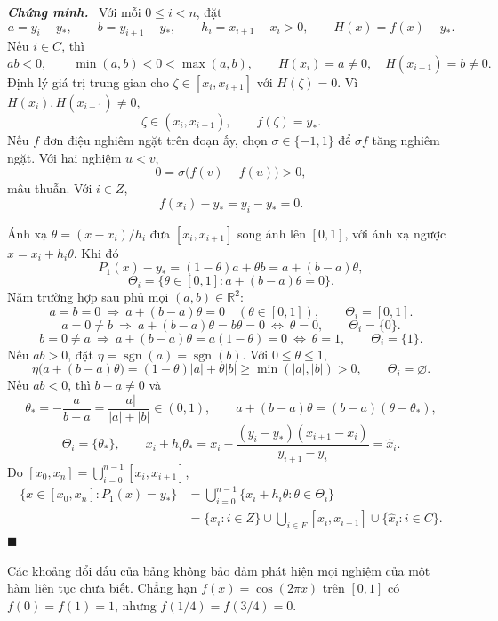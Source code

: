 \documentclass[12pt,a4paper,oneside]{book}
\numberwithin{algorithm}{chapter}
\theoremstyle{definition}
\newenvironment{chungminh}{\par\medskip\noindent\textbf{\textit{\color{mainblue}Chứng minh.}}\ }{\hfill$\blacksquare$\par\medskip}
\newcommand{\R}{\mathbb{R}}
\begin{document}
\begin{chungminh}
Với mỗi $0\leq i<n$, đặt
\[
 a=y_i-y_\ast,\qquad b=y_{i+1}-y_\ast,\qquad
 h_i=x_{i+1}-x_i>0,\qquad H(x)=f(x)-y_\ast.
\]
Nếu $i\in C$, thì
\[
 ab<0,\qquad\min(a,b)<0<\max(a,b),\qquad
 H(x_i)=a\ne0,\quad H(x_{i+1})=b\ne0.
\]
Định lý giá trị trung gian cho $\zeta\in[x_i,x_{i+1}]$ với
$H(\zeta)=0$. Vì $H(x_i),H(x_{i+1})\ne0$,
\[
 \zeta\in(x_i,x_{i+1}),\qquad f(\zeta)=y_\ast.
\]
Nếu $f$ đơn điệu nghiêm ngặt trên đoạn ấy, chọn
$\sigma\in\{-1,1\}$ để $\sigma f$ tăng nghiêm ngặt. Với hai nghiệm $u<v$,
\[
 0=\sigma\bigl(f(v)-f(u)\bigr)>0,
\]
mâu thuẫn. Với $i\in Z$,
\[
 f(x_i)-y_\ast=y_i-y_\ast=0.
\]

Ánh xạ $\theta=(x-x_i)/h_i$ đưa $[x_i,x_{i+1}]$ song ánh lên $[0,1]$, với ánh xạ ngược $x=x_i+h_i\theta$. Khi đó
\[
 P_1(x)-y_\ast=(1-\theta)a+\theta b=a+(b-a)\theta,
\]
\[
 \Theta_i=\{\theta\in[0,1]:a+(b-a)\theta=0\}.
\]
Năm trường hợp sau phủ mọi $(a,b)\in\R^2$:
\[
 a=b=0\ \Longrightarrow\ a+(b-a)\theta=0\quad(\theta\in[0,1]),
 \qquad\Theta_i=[0,1].
\]
\[
 a=0\ne b\ \Longrightarrow\
 a+(b-a)\theta=b\theta=0\ \Longleftrightarrow\ \theta=0,
 \qquad\Theta_i=\{0\}.
\]
\[
 b=0\ne a\ \Longrightarrow\
 a+(b-a)\theta=a(1-\theta)=0\ \Longleftrightarrow\ \theta=1,
 \qquad\Theta_i=\{1\}.
\]
Nếu $ab>0$, đặt $\eta=\operatorname{sgn}(a)=\operatorname{sgn}(b)$. Với $0\leq\theta\leq1$,
\[
 \eta\bigl(a+(b-a)\theta\bigr)
 =(1-\theta)|a|+\theta|b|
 \geq\min(|a|,|b|)>0,
 \qquad\Theta_i=\varnothing.
\]
Nếu $ab<0$, thì $b-a\ne0$ và
\[
 \theta_\ast=-\frac a{b-a}
 =\frac{|a|}{|a|+|b|}\in(0,1),\qquad
 a+(b-a)\theta=(b-a)(\theta-\theta_\ast),
\]
\[
 \Theta_i=\{\theta_\ast\},\qquad
 x_i+h_i\theta_\ast
 =x_i-\frac{(y_i-y_\ast)(x_{i+1}-x_i)}{y_{i+1}-y_i}
 =\widehat x_i.
\]
Do $[x_0,x_n]=\bigcup_{i=0}^{n-1}[x_i,x_{i+1}]$,
\begin{align*}
 \{x\in[x_0,x_n]:P_1(x)=y_\ast\}
 &=\bigcup_{i=0}^{n-1}\{x_i+h_i\theta:\theta\in\Theta_i\}\\
 &=\{x_i:i\in Z\}
   \cup\bigcup_{i\in F}[x_i,x_{i+1}]
   \cup\{\widehat x_i:i\in C\}.
\end{align*}
\end{chungminh}
Các khoảng đổi dấu của bảng không bảo đảm phát hiện mọi nghiệm của một hàm liên tục chưa biết. Chẳng hạn $f(x)=\cos(2\pi x)$ trên $[0,1]$ có $f(0)=f(1)=1$, nhưng $f(1/4)=f(3/4)=0$.
\end{document}
